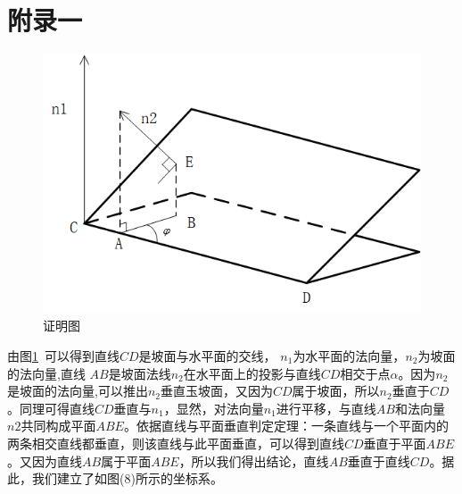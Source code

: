 \documentclass[withoutpreface,bwprint]{cumcmthesis} %
\begin{document}
    \newpage
    \section{附录一}
    \begin{figure}[h]
        \centering
        \includegraphics[scale=0.9]{21}
        \caption{证明图}
        \label{31}
    \end{figure}
    
    由图\ref{31}~可以得到直线$CD$是坡面与水平面的交线， $n_1$为水平面的法向量，$n_2$为坡面的法向量,直线 $AB$是坡面法线$n_2$在水平面上的投影与直线$CD$相交于点$\alpha$。因为$n_2$是坡面的法向量,可以推出$n_2$垂直玉坡面，又因为$CD$属于坡面，所以$n_2$垂直于$CD$。同理可得直线$CD$垂直与$n_1$，显然，对法向量$n_1$进行平移，与直线$AB$和法向量$n2$共同构成平面$ABE$。依据直线与平面垂直判定定理：一条直线与一个平面内的两条相交直线都垂直，则该直线与此平面垂直，可以得到直线$CD$垂直于平面$ABE$。又因为直线$AB$属于平面$ABE$，所以我们得出结论，直线$AB$垂直于直线$CD$。据此，我们建立了如图(8)所示的坐标系。
\end{document}
